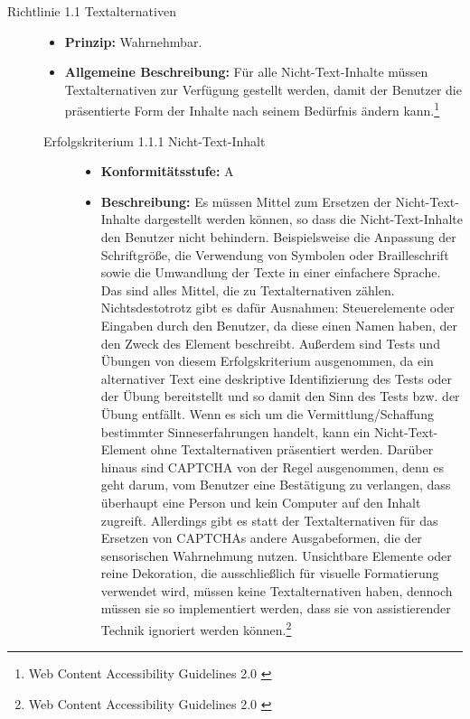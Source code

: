 \begin{description}
	\item[Richtlinie 1.1 Textalternativen]\hfill
	\begin{itemize}
		\item \textbf{Prinzip:} Wahrnehmbar.
		\item \textbf{Allgemeine Beschreibung:} Für alle Nicht-Text-Inhalte müssen Textalternativen zur Verfügung gestellt werden, damit der Benutzer die
		präsentierte Form der Inhalte nach seinem Bedürfnis ändern kann.\footnote{Web Content Accessibility Guidelines 2.0 \cite{WCAG2.0}}
	\end{itemize}
	
	\begin{description}
		\item[Erfolgskriterium 1.1.1 Nicht-Text-Inhalt]\hfill
		\begin{itemize}
			\item \textbf{Konformitätsstufe:} A
			\item \textbf{Beschreibung:} Es müssen Mittel zum Ersetzen der Nicht-Text-Inhalte dargestellt werden können, so dass die
			Nicht-Text-Inhalte den Benutzer nicht behindern. Beispielsweise die Anpassung der Schriftgröße, die Verwendung von Symbolen oder Brailleschrift sowie die Umwandlung der Texte 
			in einer einfachere Sprache. Das sind alles Mittel, die zu Textalternativen zählen.
			Nichtsdestotrotz gibt es dafür Ausnahmen: Steuerelemente oder Eingaben durch den Benutzer, da diese einen Namen haben, der den Zweck des Element
			beschreibt. Außerdem sind Tests und Übungen von diesem Erfolgskriterium ausgenommen, da ein alternativer Text eine deskriptive Identifizierung
			des Tests oder der Übung bereitstellt und so damit den Sinn des Tests bzw. der Übung entfällt. Wenn es sich um die Vermittlung/Schaffung bestimmter
			Sinneserfahrungen handelt, kann ein Nicht-Text-Element ohne Textalternativen präsentiert werden. Darüber hinaus sind \ac{CAPTCHA} von der Regel ausgenommen,
			denn es geht darum, vom Benutzer eine Bestätigung zu verlangen, dass überhaupt eine Person und kein Computer auf den Inhalt zugreift. Allerdings gibt
			es statt der Textalternativen für das Ersetzen von \ac{CAPTCHA}s andere Ausgabeformen, die der sensorischen Wahrnehmung nutzen. Unsichtbare Elemente
			oder reine Dekoration, die ausschließlich für visuelle Formatierung verwendet wird, müssen keine Textalternativen haben, dennoch müssen
			sie so implementiert werden, dass sie von assistierender Technik ignoriert werden können.\footnote{Web Content Accessibility Guidelines 2.0 \cite{WCAG2.0}}
		\end{itemize}
	\end{description}
	

\end{description}
